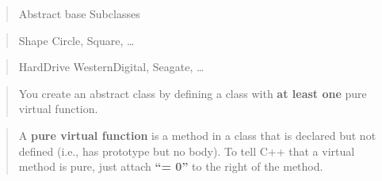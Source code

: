 \documentclass[
]{article}
\begin{document}
\begin{quote}
Abstract base Subclasses
\end{quote}

\begin{quote}
Shape Circle, Square, \ldots{}
\end{quote}

\begin{quote}
HardDrive WesternDigital, Seagate, \ldots{}
\end{quote}

\begin{quote}
\end{quote}

\begin{quote}
You create an abstract class by defining a class with \textbf{at least
one} pure virtual function.
\end{quote}

\begin{quote}
\end{quote}

\begin{quote}
A \textbf{pure virtual function} is a method in a class that is declared
but not defined (i.e., has prototype but no body). To tell C++ that a
virtual method is pure, just attach \textbf{``= 0''} to the right of the
method.
\end{quote}
\end{document}
